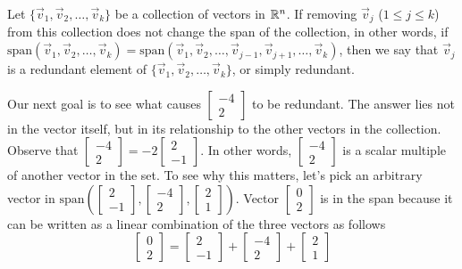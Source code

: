 \documentclass{ximera}
\begin{document}
\begin{definition}\label{def:redundant}
Let $\{\vec{v}_1,\vec{v}_2,\dots,\vec{v}_k\}$ be a collection of vectors in $\mathbb{R}^n$.  If removing $\vec{v}_j$ ($1\leq j\leq k$) from this collection does not change the span of the collection, in other words, if $\mbox{span}\left(\vec{v}_1,\vec{v}_2,\dots,\vec{v}_k\right)=\mbox{span}\left(\vec{v}_1,\vec{v}_2,\dots,\vec{v}_{j-1},\vec{v}_{j+1},\dots,\vec{v}_k\right)$, then we say that $\vec{v}_j$ is a redundant element of $\{\vec{v}_1,\vec{v}_2,\dots,\vec{v}_k\}$, or simply redundant.
\end{definition}

Our next goal is to see what causes $\begin{bmatrix}-4\\2\end{bmatrix}$ to be redundant.  The answer lies not in the vector itself, but in its relationship to the other vectors in the collection. Observe that $\begin{bmatrix}-4\\2\end{bmatrix}=-2\begin{bmatrix}2\\-1\end{bmatrix}$.  In other words, $\begin{bmatrix}-4\\2\end{bmatrix}$ is a scalar multiple of another vector in the set.  To see why this matters, let's pick an arbitrary vector in $\mbox{span}\left(\begin{bmatrix}2\\-1\end{bmatrix}, \begin{bmatrix}-4\\2\end{bmatrix}, \begin{bmatrix}2\\1\end{bmatrix}\right)$.  Vector $\begin{bmatrix}0\\2\end{bmatrix}$ is in the span because it can be written as a linear combination of the three vectors as follows
$$\begin{bmatrix}0\\2\end{bmatrix}=\begin{bmatrix}2\\-1\end{bmatrix}+ \begin{bmatrix}-4\\2\end{bmatrix}+ \begin{bmatrix}2\\1\end{bmatrix}$$
\end{document}
